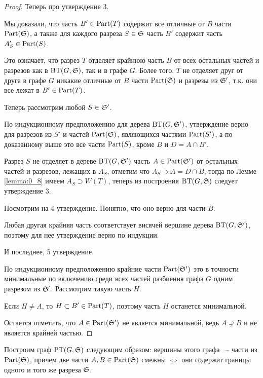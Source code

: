 \documentclass[../main.tex]{subfiles}
\begin{document}
\begin{proof}
	Теперь про утверждение 3.

	Мы доказали, что часть $B' \in \Part(T)$ содержит все отличные от $B$ части $\Part(\S)$, а также для каждого разреза $S \in \S$ часть $B'$ содержит часть $A'_S \in \Part(S)$.

	Это означает, что разрез $T$ отделяет крайнюю часть $B$ от всех остальных частей и разрезов как в $\BT(G, \S)$, так и в графе $G$. Более того, $T$ не отделяет друг от друга в графе $G$ никакие отличные от $B$ части $\Part(\S)$ и разрезы из $\S'$, т.к. они все лежат в $B' \in \Part(T)$.

	Теперь рассмотрим любой $S \in \S'$.

	 По индукционному предположению для дерева $\BT(G, \S')$, утверждение верно для разрезов из $S'$ и частей $\Part(\S)$, являющихся частями $\Part(S')$, а по доказанному выше это все части $\Part(S)$, кроме $B$ и $D = A \cap B'$.

	 Разрез $S$ не отделяет в дереве $\BT(G, \S')$ часть $A \in \Part(\S')$ от остальных частей и разрезов, лежащих в $A_S$, отметим что  $A_S \supset A = D \cap B$, тогда по Лемме \ref{lemma:0_8} имеем $A_S \supset W(T)$, теперь из построения $\BT(G, \S)$ следует утверждение 3.

	 Посмотрим на 4 утверждение. Понятно, что оно верно для части $B$.

	 Любая другая крайняя часть соответствует висячей вершине дерева $\BT(G, \S')$, поэтому для нее утверждение верно по индукции.

	 И последнее, 5 утверждение.

	 По индукционному предположению крайние части  $\Part(\S')$ это в точности минимальные по включению среди всех частей разбиения графа $G$ одним разрезом из $\S' $. Рассмотрим такую часть $H$.

	 Если $H \neq A$, то $H \subset B' \in \Part(T)$, поэтому часть $H$ останется минимальной.

	 Остается отметить, что $A \in \Part(\S')$ не является минимальной, ведь $A \supsetneq B$ и не является крайней частью.

\end{proof}

\begin{df*}[$\PT(G, \S)$]
	Построим граф $\PT(G, \S)$ следующим образом: вершины этого графа ~-- части из $\Part(\S)$, причем две части $A, B \in \Part(\S)$ смежны $\iff$ они содержат границы одного и того же разреза $\S$.
\end{df*}
\end{document}
